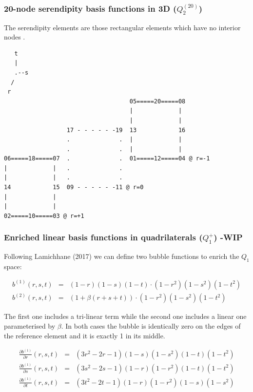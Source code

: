 \subsubsection{20-node serendipity basis functions in 3D ($Q_2^{(20)}$)}
 

The serendipity elements are those rectangular elements which have no
interior nodes \cite[p91]{reddybook2}.

\begin{verbatim}
   t
   |
   .--s
  /
 r
                                    05=====20=====08 
                                    |             |  
                                    |             |  
                  17 - - - - - -19  13            16
                  .              .  |             |  
                  .              .  |             |  
06=====18=====07  .              .  01=====12=====04 @ r=-1
|             |   .              . 
|             |   .              .  
14            15  09 - - - - - -11 @ r=0
|             |   
|             |  
02=====10=====03 @ r=+1
\end{verbatim}



\subsubsection{Enriched linear basis functions in quadrilaterals ($Q_1^+$) -WIP} \label{ss:quadmini3D}

Following Lamichhane (2017) \cite{lami17} we can define two bubble functions to enrich the 
$Q_1$ space:

\begin{eqnarray}
b^{(1)} (r,s,t) &=& (1-r)(1-s)(1-t) \cdot (1-r^2) (1-s^2) (1-t^2) \\
b^{(2)} (r,s,t) &=& (1 + \beta(r+s+t)) \cdot (1-r^2) (1-s^2) (1-t^2) 
\end{eqnarray}

The first one includes a tri-linear term while the second one includes a linear one parameterised by $\beta$.
In both cases the bubble is identically zero on the edges of the reference element and it is exactly 1 
in its middle.

\begin{eqnarray}
\frac{\partial b^{(1)}}{\partial r}(r,s,t) &=& (3r^2-2r-1)(1-s)(1-s^2)(1-t)(1-t^2) \\ 
\frac{\partial b^{(1)}}{\partial s}(r,s,t) &=& (3s^2-2s-1)(1-r)(1-r^2)(1-t)(1-t^2) \\ 
\frac{\partial b^{(1)}}{\partial t}(r,s,t) &=& (3t^2-2t-1)(1-r)(1-r^2)(1-s)(1-s^2)  
\end{eqnarray}


